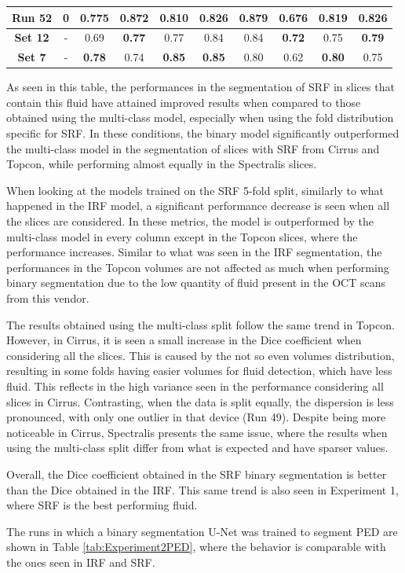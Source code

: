 \begin{table}[!ht]
\begin{tabular}{|c|c|cc|cc|cc|cc|}
		\textbf{Run 52} & 0 & 0.775 & \textbf{0.872} & 0.810 & 0.826 & 0.879 & 0.676 & 0.819 & \textbf{0.826} \\
		
		\hline
		
		\textbf{Set 12} & - & 0.69 & \textbf{0.77} & 0.77 & 0.84 & 0.84 & \textbf{0.72} & 0.75 & \textbf{0.79} \\
		
		\hline
		\hline
		
		\textbf{Set 7} & - & \textbf{0.78} & 0.74 & \textbf{0.85} & \textbf{0.85} & 0.80 & 0.62 & \textbf{0.80} & 0.75 \\
		
		\hline
		
	\end{tabular}
	\label{tab:Experiment2SRF}
\end{table}

As seen in this table, the performances in the segmentation of SRF in slices that contain this fluid have attained improved results when compared to those obtained using the multi-class model, especially when using the fold distribution specific for SRF. In these conditions, the binary model significantly outperformed the multi-class model in the segmentation of slices with SRF from Cirrus and Topcon, while performing almost equally in the Spectralis slices.
\par
When looking at the models trained on the SRF 5-fold split, similarly to what happened in the IRF model, a significant performance decrease is seen when all the slices are considered. In these metrics, the model is outperformed by the multi-class model in every column except in the Topcon slices, where the performance increases. Similar to what was seen in the IRF segmentation, the performances in the Topcon volumes are not affected as much when performing binary segmentation due to the low quantity of fluid present in the OCT scans from this vendor.
\par
The results obtained using the multi-class split follow the same trend in Topcon. However, in Cirrus, it is seen a small increase in the Dice coefficient when considering all the slices. This is caused by the not so even volumes distribution, resulting in some folds having easier volumes for fluid detection, which have less fluid. This reflects in the high variance seen in the performance considering all slices in Cirrus. Contrasting, when the data is split equally, the dispersion is less pronounced, with only one outlier in that device (Run 49). Despite being more noticeable in Cirrus, Spectralis presents the same issue, where the results when using the multi-class split differ from what is expected and have sparser values.
\par
Overall, the Dice coefficient obtained in the SRF binary segmentation is better than the Dice obtained in the IRF. This same trend is also seen in Experiment 1, where SRF is the best performing fluid.
\par
The runs in which a binary segmentation U-Net was trained to segment PED are shown in Table \ref{tab:Experiment2PED}, where the behavior is comparable with the ones seen in IRF and SRF.

